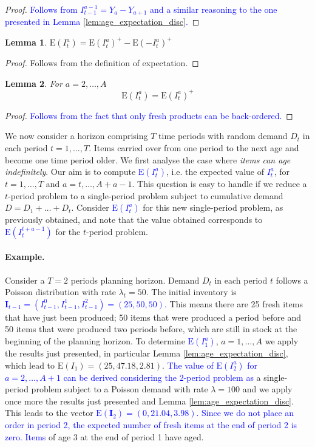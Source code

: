 \documentclass{tPRS2e}
\newcommand{\blue}{\textcolor{blue}}
\newtheorem{lem}{Lemma}
\begin{document}
	\begin{proof}
	\blue{Follows from $I^{a-1}_{t-1}=Y_a-Y_{a+1}$ and a similar reasoning to the one presented in Lemma \ref{lem:age_expectation_disc}.}
	\end{proof}
%	
	\begin{lem}
		$\mathrm{E}(I^a_{t})=\mathrm{E}(I^a_{t})^+ -\mathrm{E}(-I^a_{t})^+$
	\end{lem}
	\begin{proof}
		Follows from the definition of expectation.
	\end{proof}
%	
	\begin{lem}
		For $a=2,\ldots,A$
		\[\mathrm{E}(I^a_{t})=\mathrm{E}(I^a_{t})^+\]
	\end{lem}
	\begin{proof}
		\blue{Follows from the fact that only fresh products can be back-ordered.} 
	\end{proof}
%	
We now consider a horizon comprising $T$ time periods with random demand $D_t$ in each period $t=1,\ldots,T$. Items carried over from one period to the next age and become one time period older. We first analyse the case where {\em items can age indefinitely}. Our aim is to compute \blue{$\mathrm{E}(I^a_t)$}, i.e. the expected value of \blue{$I^a_{t}$}, for $t=1,\ldots,T$ and $a=t,\ldots,A+a-1$. This question is easy to handle if we reduce a $t$-period problem to a single-period problem subject to cumulative demand $D=D_1+\ldots+D_t$. Consider \blue{$\mathrm{E}(I^a_{t})$} for this new single-period problem, as previously obtained, and note that the value obtained corresponds to \blue{$\mathrm{E}(I^{t+a-1}_{t})$} for the $t$-period problem.
	
\paragraph*{\bf Example.} Consider a $T=2$ periods planning horizon. Demand $D_t$ in each period $t$ follows a Poisson distribution with rate $\lambda_t=50$. The initial inventory is \blue{$\mathbf{I}_{t-1}=(I^0_{t-1}, I^1_{t-1}, I^2_{t-1})=(25,50,50)$.} This means there are 25 fresh items that have just been produced; 50 items that were produced a period before and 50 items that were produced two periods before, which are still in stock at the beginning of the planning horizon. To determine \blue{$\mathrm{E}(I^a_{1})$}, $a=1,\ldots,A$ we apply the results just presented, in particular Lemma \ref{lem:age_expectation_disc}, which lead to $\mathrm{E}(I_1)=(25, 47.18, 2.81)$. \blue{The value of $\mathrm{E}(I^a_2)$ for $a=2,\ldots,A+1$ can be derived considering the $2$-period problem as} a single-period problem subject to a Poisson demand with rate $\lambda=100$ and we apply once more the results just presented and Lemma \ref{lem:age_expectation_disc}. This leads to the vector \blue{$\mathrm{E}(\mathbf{I}_2)=(0, 21.04, 3.98)$. Since we do not place an order in period 2, the expected number of fresh items at the end of period 2 is zero. Items} of age 3 at the end of period 1 have aged.
	
\end{document}
